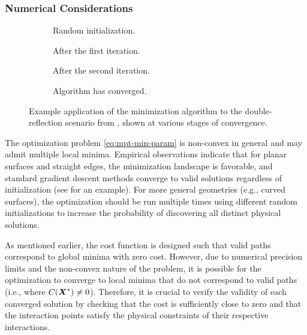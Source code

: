 \subsubsection{Numerical Considerations}

\begin{figure}
  \centering
  \begin{subfigure}[b]{0.49\contentwidth}
    \centering
    \caption{Random initialization.}
  \end{subfigure}
  \begin{subfigure}[b]{0.49\contentwidth}
    \centering
    \caption{After the first iteration.}
  \end{subfigure}

  \begin{subfigure}[b]{0.49\contentwidth}
    \centering
    \caption{After the second iteration.}
  \end{subfigure}
  \begin{subfigure}[b]{0.49\contentwidth}
    \centering
    \caption{Algorithm has converged.}
  \end{subfigure}
  \caption{Example application of the  minimization algorithm to the double-reflection scenario from , shown at various stages of convergence.}
\end{figure}

The optimization problem \eqref{eq:mpt-min-param} is non-convex in general and may admit multiple local minima. Empirical observations indicate that for planar surfaces and straight edges, the minimization landscape is favorable, and standard gradient descent methods converge to valid solutions regardless of initialization (see  for an example). For more general geometries (e.g., curved surfaces), the optimization should be run multiple times using different random initializations to increase the probability of discovering all distinct physical solutions.

As mentioned earlier, the cost function is designed such that valid paths correspond to global minima with zero cost. However, due to numerical precision limits and the non-convex nature of the problem, it is possible for the optimization to converge to local minima that do not correspond to valid paths (i.e., where $C(\boldsymbol{X}^\star) \neq 0$). Therefore, it is crucial to verify the validity of each converged solution by checking that the cost is sufficiently close to zero and that the interaction points satisfy the physical constraints of their respective interactions.

